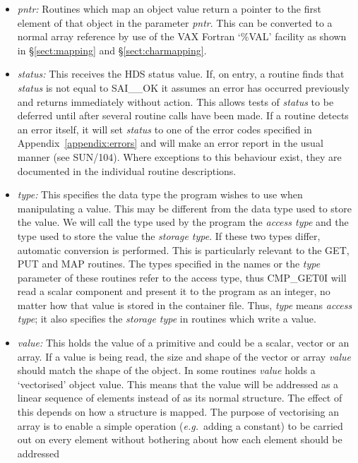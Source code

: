 \begin{itemize}
\item {\em pntr:}
Routines which map an object value return a pointer to the first element of
that object in the parameter {\em pntr}. This can be converted to a normal
array reference by use of the VAX Fortran `\%VAL' facility as shown in
\S\ref{sect:mapping} and \S\ref{sect:charmapping}.

\item {\em status:}
This receives the HDS status value. If, on entry, a routine finds that {\em
status} is not equal to SAI\_\_OK it assumes an error has occurred previously
and returns immediately without action. This allows tests of {\em status} to be
deferred until after several routine calls have been made. If a routine detects
an error itself, it will set {\em status} to one of the error codes specified
in Appendix~\ref{appendix:errors} and will make an error report in the usual
manner (see SUN/104). Where exceptions to this behaviour exist, they are
documented in the individual routine descriptions.

\item {\em type:}
This specifies the data type the program wishes to use when manipulating a
value. This may be different from the data type used to store the value. We
will call the type used by the program the {\em access type} and the type used
to store the value the {\em storage type}. If these two types differ, automatic
conversion is performed. This is particularly relevant to the GET, 
PUT and MAP routines. The types specified in the names or the {\em type}
parameter of these routines refer to the access type, thus CMP\_GET0I
will read a scalar component and present it to the program as an integer, no
matter how that value is stored in the container file. Thus, {\em type} means
{\em access type}; it also specifies the {\em storage type} in routines which
write a value.

\item {\em value:}
This holds the value of a primitive and could be a scalar, vector or an array.
If a value is being read, the size and shape of the vector or array {\em value}
should match the shape of the object. In some routines {\em value} holds a
`vectorised' object value. This means that the value will be addressed as a
linear sequence of elements instead of as its normal structure. The effect of
this depends on how a structure is mapped. The purpose of vectorising an array
is to enable a simple operation ({\em e.g.}\ adding a constant) to be carried
out on every element without bothering about how each element should be
addressed

\end{itemize}


